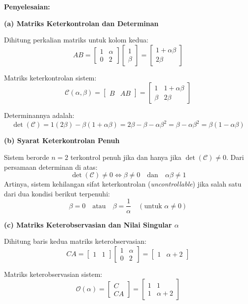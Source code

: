 \documentclass[11pt,a4paper]{article}
\begin{document}
\textbf{Penyelesaian:}

\textbf{(a) Matriks Keterkontrolan dan Determinan}

Dihitung perkalian matriks untuk kolom kedua:
$$AB = \begin{bmatrix} 1 & \alpha \\ 0 & 2 \end{bmatrix} \begin{bmatrix} 1 \\ \beta \end{bmatrix} = \begin{bmatrix} 1 + \alpha \beta \\ 2\beta \end{bmatrix}$$

Matriks keterkontrolan sistem:
$$\mathcal{C}(\alpha, \beta) = \begin{bmatrix} B & AB \end{bmatrix} = \begin{bmatrix} 1 & 1 + \alpha\beta \\ \beta & 2\beta \end{bmatrix}$$

Determinannya adalah:
$$\det(\mathcal{C}) = 1(2\beta) - \beta(1 + \alpha\beta) = 2\beta - \beta - \alpha\beta^2 = \beta - \alpha\beta^2 = \beta(1 - \alpha\beta)$$

\textbf{(b) Syarat Keterkontrolan Penuh}

Sistem berorde $n = 2$ terkontrol penuh jika dan hanya jika $\det(\mathcal{C}) \ne 0$. Dari persamaan determinan di atas:
$$\det(\mathcal{C}) \ne 0 \iff \beta \ne 0 \quad \text{dan} \quad \alpha\beta \ne 1$$
Artinya, sistem kehilangan sifat keterkontrolan (\textit{uncontrollable}) jika salah satu dari dua kondisi berikut terpenuhi:
$$\beta = 0 \quad \text{atau} \quad \beta = \frac{1}{\alpha} \quad (\text{untuk } \alpha \ne 0)$$

\textbf{(c) Matriks Keterobservasian dan Nilai Singular $\alpha$}

Dihitung baris kedua matriks keterobservasian:
$$CA = \begin{bmatrix} 1 & 1 \end{bmatrix} \begin{bmatrix} 1 & \alpha \\ 0 & 2 \end{bmatrix} = \begin{bmatrix} 1 & \alpha + 2 \end{bmatrix}$$

Matriks keterobservasian sistem:
$$\mathcal{O}(\alpha) = \begin{bmatrix} C \\ CA \end{bmatrix} = \begin{bmatrix} 1 & 1 \\ 1 & \alpha + 2 \end{bmatrix}$$
\end{document}
